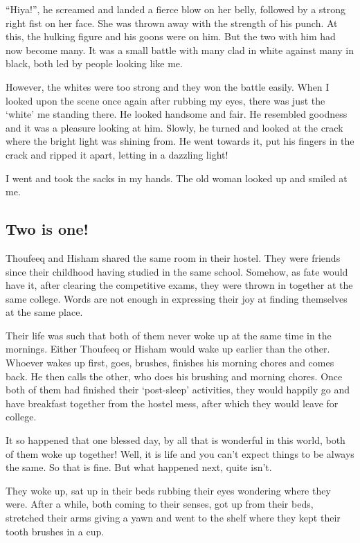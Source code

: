 \documentclass[twoside,11pt,titlepage]{article}
\begin{document}
``Hiya!'', he screamed and landed a fierce blow on her belly, followed by a strong right fist on her face. She was thrown away with the strength of his punch. At this, the hulking figure and his goons were on him. But the two with him had now become many. It was a small battle with many clad in white against many in black, both led by people looking like me.

However, the whites were too strong and they won the battle easily. When I looked upon the scene once again after rubbing my eyes, there was just the `white' me standing there. He looked handsome and fair. He resembled goodness and it was a pleasure looking at him. Slowly, he turned and looked at the crack where the bright light was shining from. He went towards it, put his fingers in the crack and ripped it apart, letting in a dazzling light!

I went and took the sacks in my hands. The old woman looked up and smiled at me.
\newpage
\begin{center}
  \section{Two is one!}
\end{center}
\bigskip
\bigskip
\bigskip

Thoufeeq and Hisham shared the same room in their hostel. They were friends since their childhood having studied in the same school. Somehow, as fate would have it, after clearing the competitive exams, they were thrown in together at the same college. Words are not enough in expressing their joy at finding themselves at the same place. 

Their life was such that both of them never woke up at the same time in the mornings. Either Thoufeeq or Hisham would wake up earlier than the other. Whoever wakes up first, goes, brushes, finishes his morning chores and comes back. He then calls the other, who does his brushing and morning chores. Once both of them had finished their `post-sleep' activities, they would happily go and have breakfast together from the hostel mess, after which they would leave for college.

It so happened that one blessed day, by all that is wonderful in this world, both of them woke up together! Well, it is life and you can't expect things to be always the same. So that is fine. But what happened next, quite isn't.

They woke up, sat up in their beds rubbing their eyes wondering where they were. After a while, both coming to their senses, got up from their beds, stretched their arms giving a yawn and went to the shelf where they kept their tooth brushes in a cup.
\end{document}

